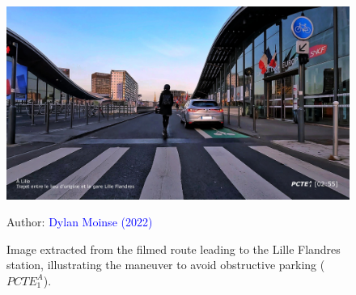 \begin{refsegment}
\begin{figure}[h!]\vspace*{4pt}
    \caption{Image extracted from the filmed route leading to the Lille Flandres station, illustrating the maneuver to avoid obstructive parking (\(PCTE^{A}_{1}\)).}
    \label{fig-chap4:pcte1a-stationnement-genant}
    \centerline{\includegraphics[width=1\columnwidth]{src/Figures/Chap-4/Extrait_Video_PCTE1_Access_8.jpg}}
    \vspace{5pt}
    \begin{flushright}\scriptsize{
    Author: \textcolor{blue}{Dylan Moinse (2022)}
    }\end{flushright}
\end{figure}


\end{refsegment}
